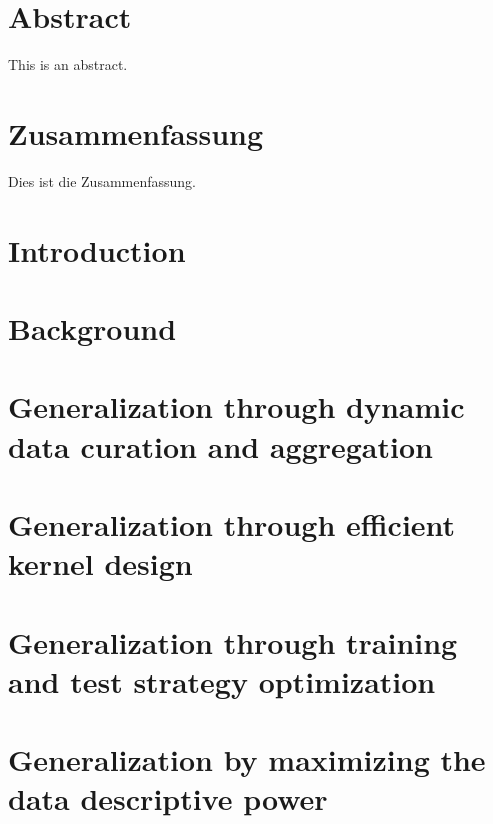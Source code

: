 \documentclass[11pt, a4paper, oneside, headsepline, titlepage, DIV=11, BCOR=12mm, captions=tableheading, chapterprefix=on, numbers=noenddot]{scrbook}
\begin{document}
    \thispagestyle{headings}
    

    \enlargethispage{1\baselineskip}
    \setcounter{page}{1}

    \chapter*{Abstract} %
        This is an abstract.
    \cleardoublepage

    \chapter*{Zusammenfassung} %
        Dies ist die Zusammenfassung.
    \cleardoublepage

    \tableofcontents
    \cleardoublepage

    \chapter{Introduction} %
    

    \chapter{Background} %
    

    \chapter{Generalization through dynamic data curation and aggregation}
        

    \chapter{Generalization through efficient kernel design}
        

    \chapter{Generalization through training and test strategy optimization}
        

    \chapter{Generalization by maximizing the data descriptive power}
        
\end{document}
